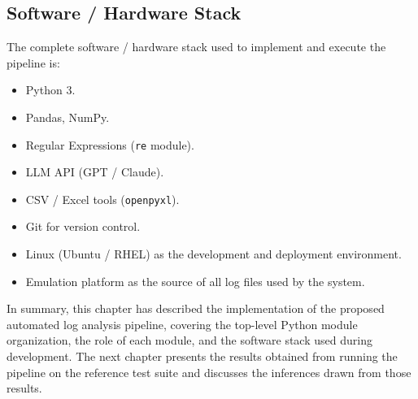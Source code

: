 \subsection{Software / Hardware Stack}
The complete software / hardware stack used to implement and execute the pipeline is:
\begin{itemize}
\item Python 3.
\item Pandas, NumPy.
\item Regular Expressions (\texttt{re} module).
\item LLM API (GPT / Claude).
\item CSV / Excel tools (\texttt{openpyxl}).
\item Git for version control.
\item Linux (Ubuntu / RHEL) as the development and deployment environment.
\item Emulation platform as the source of all log files used by the system.
\end{itemize}

In summary, this chapter has described the implementation of the proposed automated log analysis pipeline, covering the top-level Python module organization, the role of each module, and the software stack used during development. The next chapter presents the results obtained from running the pipeline on the reference test suite and discusses the inferences drawn from those results.
